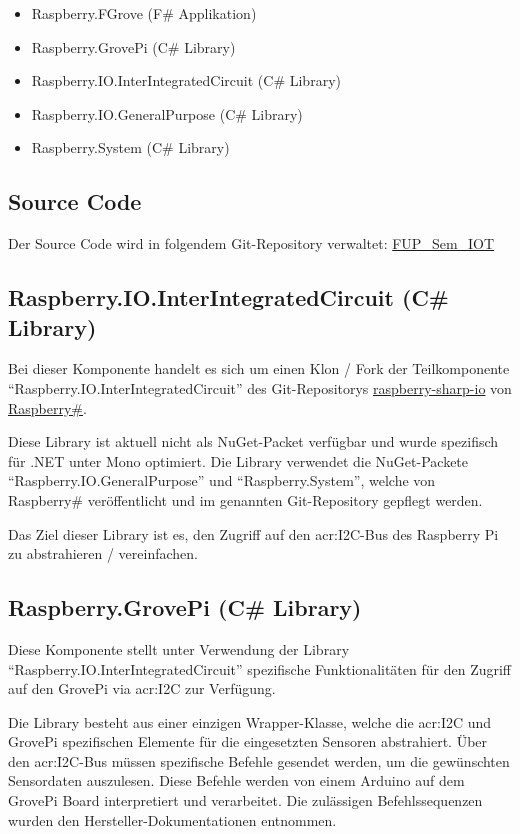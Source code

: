 \begin{itemize}
\item Raspberry.FGrove (F\# Applikation)
\item Raspberry.GrovePi (C\# Library)
\item Raspberry.IO.InterIntegratedCircuit (C\# Library)
\item Raspberry.IO.GeneralPurpose (C\# Library)
\item Raspberry.System (C\# Library)
\end{itemize}


\subsection{Source Code}
Der Source Code wird in folgendem Git-Repository verwaltet: \hyperlink{https://github.com/Liechtathlet/FUP_Sem_IOT}{FUP\_Sem\_IOT}

\subsection{Raspberry.IO.InterIntegratedCircuit (C\# Library)}
Bei dieser Komponente handelt es sich um einen Klon / Fork der Teilkomponente "`Raspberry.IO.InterIntegratedCircuit"' des Git-Repositorys \hyperlink{https://github.com/raspberry-sharp/raspberry-sharp-io/tree/master/Raspberry.IO.InterIntegratedCircuit}{raspberry-sharp-io} von \hyperlink{https://github.com/raspberry-sharp}{Raspberry\#}.

Diese Library ist aktuell nicht als NuGet-Packet verfügbar und wurde spezifisch für .NET unter Mono optimiert. Die Library verwendet die NuGet-Packete "`Raspberry.IO.GeneralPurpose"' und "`Raspberry.System"', welche von Raspberry\# veröffentlicht und im genannten Git-Repository gepflegt werden.

Das Ziel dieser Library ist es, den Zugriff auf den \gls{acr:I2C}-Bus des Raspberry Pi zu abstrahieren / vereinfachen.

\subsection{Raspberry.GrovePi (C\# Library)}
Diese Komponente stellt unter Verwendung der Library "`Raspberry.IO.InterIntegratedCircuit"' spezifische Funktionalitäten für den Zugriff auf den GrovePi via \gls{acr:I2C} zur Verfügung.

Die Library besteht aus einer einzigen Wrapper-Klasse, welche die \gls{acr:I2C} und GrovePi spezifischen Elemente für die eingesetzten Sensoren abstrahiert. Über den \gls{acr:I2C}-Bus müssen spezifische Befehle gesendet werden, um die gewünschten Sensordaten auszulesen. Diese Befehle werden von einem Arduino auf dem GrovePi Board interpretiert und verarbeitet. Die zulässigen Befehlssequenzen wurden den Hersteller-Dokumentationen entnommen.

